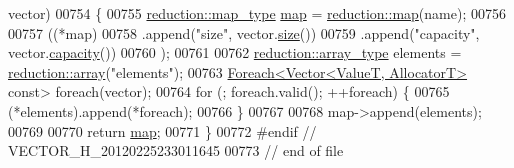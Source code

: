 \begin{DoxyCode}
      vector)
00754 \{
00755     \hyperlink{classhryky_1_1_intrusive_ptr}{reduction::map_type} \hyperlink{namespacehryky_1_1reduction_ac5eae270cf8047b294dc4ff3e5e11a79}{map} = \hyperlink{namespacehryky_1_1reduction_ac5eae270cf8047b294dc4ff3e5e11a79}{reduction::map}(name);
00756 
00757     ((*map)
00758      .append(\textcolor{stringliteral}{"size"},        vector.\hyperlink{classhryky_1_1_vector_a4bf9016a68dd7bf4967bf202b884a4fa}{size}())
00759      .append(\textcolor{stringliteral}{"capacity"},    vector.\hyperlink{classhryky_1_1_vector_a0865b1eec33d6dfe008eb7c24afd5f97}{capacity}())
00760      );
00761 
00762     \hyperlink{classhryky_1_1_intrusive_ptr}{reduction::array_type} elements = \hyperlink{namespacehryky_1_1reduction_a9d45a4dc1ea9a6668ebd192f296f788c}{reduction::array}(\textcolor{stringliteral}{"elements"});
00763     \hyperlink{classhryky_1_1_foreach}{Foreach<Vector<ValueT, AllocatorT>} \textcolor{keyword}{const}> \textcolor{keywordflow}{foreach}(vector);
00764     \textcolor{keywordflow}{for} (; \textcolor{keywordflow}{foreach}.valid(); ++\textcolor{keywordflow}{foreach}) \{
00765         (*elements).append(*\textcolor{keywordflow}{foreach});
00766     \}
00767 
00768     map->append(elements);
00769     
00770     \textcolor{keywordflow}{return} \hyperlink{namespacehryky_1_1reduction_ac5eae270cf8047b294dc4ff3e5e11a79}{map};
00771 \}
00772 \textcolor{preprocessor}{#endif // VECTOR\_H\_20120225233011645}
00773 \textcolor{preprocessor}{}\textcolor{comment}{// end of file}
\end{DoxyCode}
